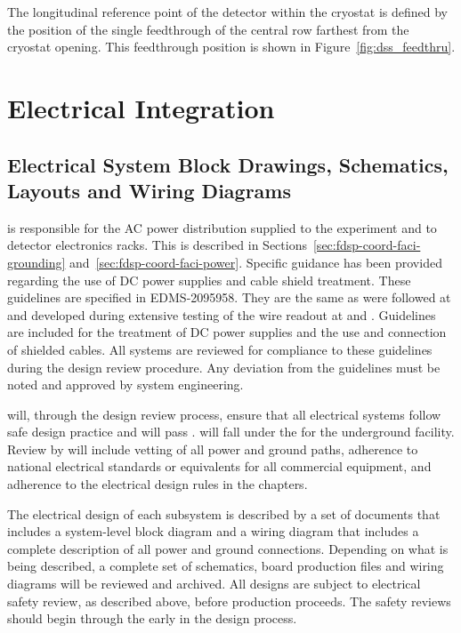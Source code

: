 The longitudinal reference point of the detector within the cryostat
is defined by the position of the single feedthrough of the central row
farthest from the cryostat opening. This feedthrough position
is shown in Figure~\ref{fig:dss_feedthru}.






\section{Electrical Integration}
\label{sec:fdsp-Integ-electrical}



\subsection{Electrical System Block Drawings, Schematics, Layouts and Wiring Diagrams}
\label{sec:fdsp-coord-electrical}


 is responsible for the AC power distribution supplied to
the experiment and to detector electronics racks.  This is described
in Sections~\ref{sec:fdsp-coord-faci-grounding}
and~\ref{sec:fdsp-coord-faci-power}.  Specific guidance has been
provided regarding the use of DC power supplies and cable shield
treatment.  These guidelines are specified in
EDMS-2095958\cite{bib:cernedms2095958}. They are the same as were
followed at  and developed during extensive testing
of the  wire readout at  and .
Guidelines are included for the treatment of DC power supplies and the
use and connection of shielded cables.  All systems are reviewed for
compliance to these guidelines during the design review procedure.
Any deviation from the guidelines must be noted and approved by system
engineering.

 will, through the design review process, ensure
that all electrical systems  follow safe design practice and
will pass .   will fall under the  for the
underground facility.  Review by  will include
vetting of all power and ground paths, adherence to national
electrical standards or equivalents for all commercial equipment, and
adherence to the electrical design rules in the   %
chapters.

The electrical design of each subsystem is described by a set of
documents that includes a system-level block diagram and a wiring
diagram that includes a complete description of all power and ground
connections.  Depending on what is being described, a complete set of
schematics, board production files and wiring diagrams will be
reviewed and archived.  All designs are subject to electrical safety
review, as described above, before production proceeds. The safety
reviews should begin through the  early in the design
process.



